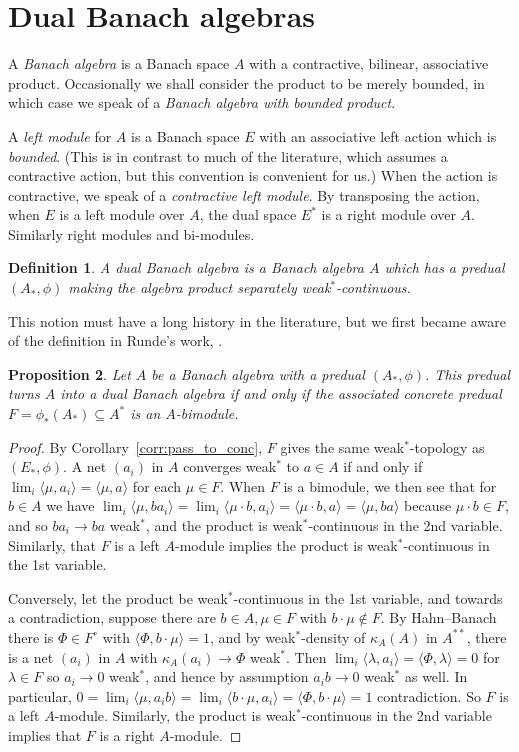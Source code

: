 \documentclass[a4paper,11pt]{article}
\theoremstyle{plain}
\newtheorem{proposition}{Proposition}[section]
\newtheorem{definition}[proposition]{Definition}
\theoremstyle{remark}
\newcommand{\ip}[2]{{\langle {#1} , {#2} \rangle}}
\begin{document}
\clearpage
\section{Dual Banach algebras}

A \emph{Banach algebra} is a Banach space $A$ with a contractive, bilinear, associative product.  Occasionally we shall consider the product to be merely bounded, in which case we speak of a \emph{Banach algebra with bounded product}.

A \emph{left module} for $A$ is a Banach space $E$ with an associative left action which is \emph{bounded}.  (This is in contrast to much of the literature, which assumes a contractive action, but this convention is convenient for us.)  When the action is contractive, we speak of a \emph{contractive left module}.  By transposing the action, when $E$ is a left module over $A$, the dual space $E^*$ is a right module over $A$.  Similarly right modules and bi-modules.

\begin{definition}
A \emph{dual Banach algebra} is a Banach algebra $A$ which has a predual $(A_*, \phi)$ making the algebra product separately weak$^*$-continuous.
\end{definition}

This notion must have a long history in the literature, but we first became aware of the definition in Runde's work, \cite{Runde_DBA}.

\begin{proposition}
Let $A$ be a Banach algebra with a predual $(A_*, \phi)$.  This predual turns $A$ into a dual Banach algebra if and only if the associated concrete predual $F = \phi_*(A_*) \subseteq A^*$ is an $A$-bimodule.
\end{proposition}
\begin{proof}
By Corollary~\ref{corr:pass_to_conc}, $F$ gives the same weak$^*$-topology as $(E_*,\phi)$.  A net $(a_i)$ in $A$ converges weak$^*$ to $a\in A$ if and only if $\lim_i \ip{\mu}{a_i} = \ip{\mu}{a}$ for each $\mu\in F$.  When $F$ is a bimodule, we then see that for $b\in A$ we have $\lim_i \ip{\mu}{b a_i} = \lim_i \ip{\mu\cdot b}{a_i} = \ip{\mu\cdot b}{a} = \ip{\mu}{ba}$ because $\mu\cdot b\in F$, and so $ba_i \to ba$ weak$^*$, and the product is weak$^*$-continuous in the 2nd variable.  Similarly, that $F$ is a left $A$-module implies the product is weak$^*$-continuous in the 1st variable.

Conversely, let the product be weak$^*$-continuous in the 1st variable, and towards a contradiction, suppose there are $b\in A, \mu\in F$ with $b\cdot\mu \not\in F$.  By Hahn--Banach there is $\Phi\in F^\circ$ with $\ip{\Phi}{b\cdot\mu} = 1$, and by weak$^*$-density of $\kappa_A(A)$ in $A^{**}$, there is a net $(a_i)$ in $A$ with $\kappa_A(a_i) \to \Phi$ weak$^*$.  Then $\lim_i \ip{\lambda}{a_i} = \ip{\Phi}{\lambda} = 0$ for $\lambda\in F$ so $a_i \to 0$ weak$^*$, and hence by assumption $a_i b \to 0$ weak$^*$ as well.  In particular, $0 = \lim_i \ip{\mu}{a_i b} = \lim_i \ip{b\cdot\mu}{a_i} = \ip{\Phi}{b\cdot\mu} = 1$ contradiction.  So $F$ is a left $A$-module.  Similarly, the product is weak$^*$-continuous in the 2nd variable implies that $F$ is a right $A$-module.
\end{proof}
\end{document}
